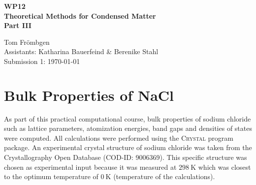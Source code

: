 \documentclass[a4paper,12pt]{scrartcl}
\begin{document}
%
\thispagestyle{empty}

%
\begin{center}
	\begin{LARGE}
		\vspace{50mm}
		\textbf{WP12} \\
		\vspace{15mm}
		\textbf{Theoretical Methods for Condensed Matter} \\
		\vspace{15mm}
		\textbf{Part III} \\
		\vspace{30mm}
	\end{LARGE}
	\begin{large}
		Tom Frömbgen \\
		\vspace{20mm}
		Assistants: Katharina Bauerfeind \& Berenike Stahl  \\
		\vspace{10mm}
		Submission 1: \today \\
		\vspace{5mm}
	\end{large}
\end{center}

%
%
\newpage
{}
\section{Bulk Properties of NaCl}
%
As part of this practical computational course, bulk properties of sodium chloride such as lattice parameters, atomization energies, band gaps and densities of states were computed. All calculations were performed using the \textsc{Crystal} program package.\autocite[]{crystal-1, crystal-2} An experimental crystal structure of sodium chloride was taken from the Crystallography Open Database\autocite[]{cod} (COD-ID: 9006369). This specific structure was chosen as experimental input because it was measured at $ \SI{298}{\kelvin} $ which was closest to the optimum temperature of $ \SI{0}{\kelvin} $ (temperature of the calculations).
%
\end{document}
